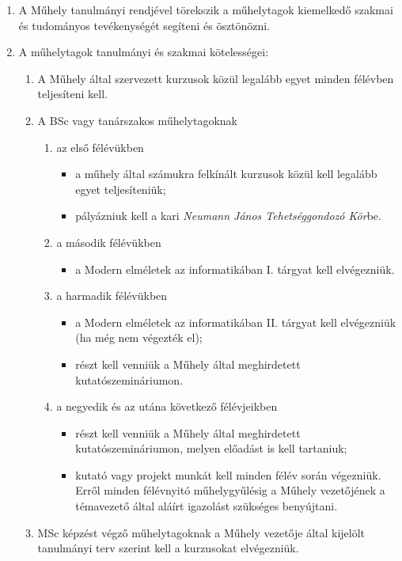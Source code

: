 \documentclass{../styles/rulebook}
\begin{document}
\begin{enumerate}
\item A Műhely tanulmányi rendjével törekszik a műhelytagok kiemelkedő szakmai és tudományos tevékenységét segíteni és ösztönözni.
\item A műhelytagok tanulmányi és szakmai kötelességei:
	\begin{enumerate}
		\item A Műhely által szervezett kurzusok közül legalább egyet minden félévben teljesíteni kell.
		\item A BSc vagy tanárszakos műhelytagoknak
			\begin{enumerate}
				\item az első félévükben 
					\begin{itemize}
						\item a műhely által számukra felkínált kurzusok közül kell legalább egyet teljesíteniük;
						\item pályázniuk kell a kari \emph{Neumann János Tehetséggondozó Kör}be.
					\end{itemize}
				\item a második félévükben
					\begin{itemize}
						\item a Modern elméletek az informatikában I. tárgyat kell elvégezniük.
					\end{itemize}
				\item a harmadik félévükben 
					\begin{itemize}
						\item a Modern elméletek az informatikában II. tárgyat kell elvégezniük (ha még nem végezték el);
						\item részt kell venniük a Műhely által meghirdetett kutatószemináriumon.
					\end{itemize}
				\item a negyedik és az utána következő félévjeikben 
					\begin{itemize}
						\item részt kell venniük a Műhely által meghirdetett kutatószemináriumon, melyen előadást is kell tartaniuk;
						\item kutató vagy projekt munkát kell minden félév során végezniük. Erről minden félévnyitó műhelygyűlésig a Műhely vezetőjének a témavezető által aláírt igazolást szükséges benyújtani.
					\end{itemize}
			\end{enumerate}
		\item MSc képzést végző műhelytagoknak a Műhely vezetője által kijelölt tanulmányi terv szerint kell a kurzusokat elvégezniük.

\end{enumerate}
\end{enumerate}
\end{document}
